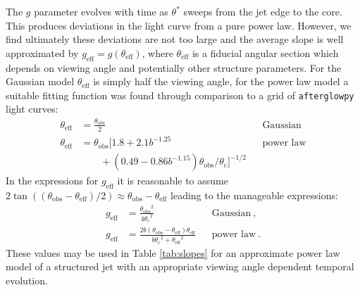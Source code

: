 \documentclass[twocolumn]{aastex62}
\newcommand{\afterglowpy}{{\tt afterglowpy}}
\newcommand{\thobs}{\ensuremath{\theta_{\mathrm{obs}}}}
\newcommand{\thC}{\ensuremath{\theta_{\mathrm{c}}}}
\newcommand{\geff}{\ensuremath{g_{\mathrm{eff}}}}
\newcommand{\theff}{\ensuremath{\theta_{\mathrm{eff}}}}
\begin{document}
The $g$ parameter evolves with time as $\theta^*$ sweeps from the jet edge to the core.  This produces deviations in the light curve from a pure power law.  However, we find ultimately these deviations are not too large and the average slope is well approximated by $\geff  = g(\theff)$, where $\theff$ is a fiducial angular section which depends on viewing angle and potentially other structure parameters.  For the Gaussian model $\theff$ is simply half the viewing angle, for the power law model a suitable fitting function was found through comparison to a grid of \afterglowpy{} light curves:
\begin{align}
	\theff &= \frac{\thobs}{2}&& \text{Gaussian} \\
	\theff &= \thobs \big [1.8+2.1b^{-1.25}  && \text{power law} \nonumber  \\
	 	& \qquad + (0.49-0.86b^{-1.15}) \thobs/\thC \big ] ^{-1/2} &&\label{eq:theff}
\end{align}
In the expressions for $\geff$ it is reasonable to assume $2 \tan((\thobs-\theff)/2) \approx \thobs-\theff$ leading to the manageable expressions:
\begin{align}
	\geff &= \frac{\thobs^2}{4\thC^2} && \text{Gaussian}\ , \\
	\geff &= \frac{2 b (\thobs-\theff)\theff}{b \thC^2+\theff^2} && \text{power law}\ . \label{eq:geff}
\end{align}
These values may be used in Table \ref{tab:slopes} for an approximate power law model of a structured jet with an appropriate viewing angle dependent temporal evolution.  
\end{document}
